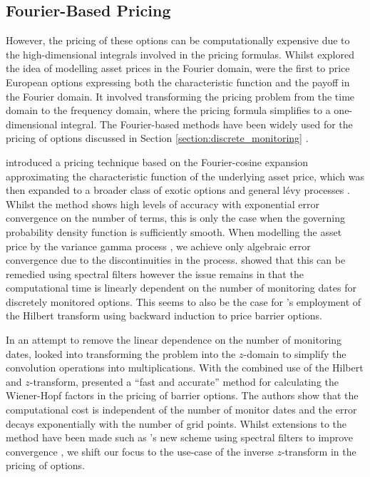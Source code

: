 \documentclass[a4paper]{report}
\begin{document}
\subsection{Fourier-Based Pricing}
However, the pricing of these options can be computationally expensive due to the high-dimensional integrals involved in the pricing formulas. Whilst \citet{heston1993closed} explored the idea of modelling asset prices in the Fourier domain, \citet{carr1999option} were the first to price European options expressing both the characteristic function and the payoff in the Fourier domain. It involved transforming the pricing problem from the time domain to the frequency domain, where the pricing formula simplifies to a one-dimensional integral. The Fourier-based methods have been widely used for the pricing of options discussed in Section \ref{section:discrete_monitoring} \citep{eberlein2010analysis}.

\citet{fang2009novel} introduced a pricing technique based on the Fourier-cosine expansion approximating the characteristic function of the underlying asset price, which was then expanded to a broader class of exotic options \citep{fang2009pricing, fang2011fourier} and general l\'evy processes \citep{lord2008fast}. Whilst the method shows high levels of accuracy with exponential error convergence on the number of terms, this is only the case when the governing probability density function is sufficiently smooth. When modelling the asset price by the variance gamma process \citep{madan1998variance}, we achieve only algebraic error convergence due to the discontinuities in the process. \citet{ruijter2015application} showed that this can be remedied using spectral filters however the issue remains in that the computational time is linearly dependent on the number of monitoring dates for discretely monitored options. This seems to also be the case for \citet{feng2008pricing}'s employment of the Hilbert transform using backward induction to price barrier options. 

In an attempt to remove the linear dependence on the number of monitoring dates, \citet{fusai2006exact} looked into transforming the problem into the $z$-domain to simplify the convolution operations into multiplications. With the combined use of the Hilbert and $z$-transform, \citet{fusai2016spitzer} presented a ``fast and accurate'' method for calculating the Wiener-Hopf factors in the pricing of barrier options. The authors show that the computational cost is independent of the number of monitor dates and the error decays exponentially with the number of grid points. Whilst extensions to the method have been made such as \citet{phelan2018fourier}'s new scheme using spectral filters to improve convergence \citep{phelan2019hilbert}, we shift our focus to the use-case of the inverse $z$-transform in the pricing of options.
\end{document}
